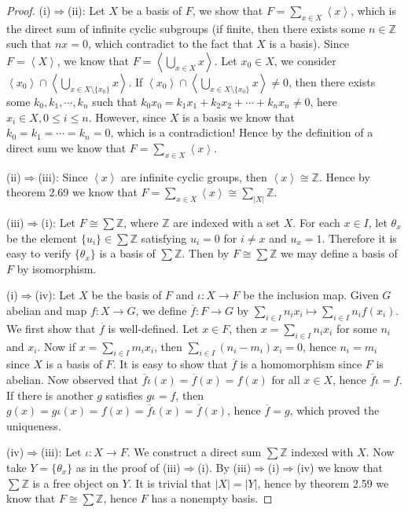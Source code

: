 \begin{proof}
(i)$\Rightarrow$(ii): Let $X$ be a basis of $F$, we show that $F=\sum_{x\in X}\left<x\right>$, which is the direct sum of infinite cyclic subgroups (if finite, then there exists some $n\in\mathbb{Z}$ such that $nx=0$, which contradict to the fact that $X$ is a basis). Since $F=\left<X\right>$, we know that $F=\left<\bigcup_{x\in X}x\right>$. Let $x_0\in X$, we consider $\left<x_0\right>\cap\left<\bigcup_{x\in X\setminus\{x_0\}}x\right>$. If $\left<x_0\right>\cap\left<\bigcup_{x\in X\setminus\{x_0\}}x\right>\ne 0$, then there exists some $k_0,k_1,\cdots,k_n$ such that $k_0x_0=k_1x_1+k_2x_2+\cdots+k_nx_n\ne 0$, here $x_i\in X,0\le i\le n$. However, since $X$ is a basis we know that $k_0=k_1=\cdots=k_n=0$, which is a contradiction! Hence by the definition of a direct sum we know that $F=\sum_{x\in X}\left<x\right>$.\par
(ii)$\Rightarrow$(iii): Since $\left<x\right>$ are infinite cyclic groups, then $\left<x\right>\cong\mathbb{Z}$. Hence by theorem 2.69 we know that $F=\sum_{x\in X}\left<x\right>\cong\sum_{|X|}\mathbb{Z}$.
\par
(iii)$\Rightarrow$(i): Let $F\cong\sum\mathbb{Z}$, where $\mathbb{Z}$ are indexed with a set $X$. For each $x\in I$, let $\theta_x$ be the element $\{u_i\}\in\sum\mathbb{Z}$ satisfying $u_i=0$ for $i\ne x$ and $u_x=1$. Therefore it is easy to verify $\{\theta_x\}$ is a basis of $\sum\mathbb{Z}$. Then by $F\cong\sum\mathbb{Z}$ we may define a basis of $F$ by isomorphism.\par
(i)$\Rightarrow$(iv): Let $X$ be the basis of $F$ and $\iota:X\to F$ be the inclusion map. Given $G$ abelian and map $f:X\to G$, we define $\overline{f}:F\to G$ by $\sum_{i\in I}n_ix_i\mapsto\sum_{i\in I}n_if(x_i)$. We first show that $\overline{f}$ is well-defined. Let $x\in F$, then $x=\sum_{i\in I}n_ix_i$ for some $n_i$ and $x_i$. Now if $x=\sum_{i\in I}m_ix_i$, then $\sum_{i\in I}(n_i-m_i)x_i=0$, hence $n_i=m_i$ since $X$ is a basis of $F$. It is easy to show that $\overline{f}$ is a homomorphism since $F$ is abelian. Now observed that $\overline{f}\iota \left( x \right) =\overline{f}\left( x \right) =f\left( x \right) $ for all $x\in X$, hence $\overline{f}\iota=f$. If there is another $g$ satisfies $g\iota=f$, then $g\left( x \right) =g\iota \left( x \right) =f\left( x \right) =\overline{f}\iota \left( x \right) =\overline{f}\left( x \right) $, hence $\overline{f}=g$, which proved the uniqueness.\par
(iv)$\Rightarrow$(iii): Let $\iota:X\to F$. We construct a direct sum $\sum\mathbb{Z}$ indexed with $X$. Now take $Y=\{\theta_x\}$ as in the proof of (iii)$\Rightarrow$(i). By (iii)$\Rightarrow$(i)$\Rightarrow$(iv) we know that $\sum\mathbb{Z}$ is a free object on $Y$. It is trivial that $|X|=|Y|$, hence by theorem 2.59 we know that $F\cong\sum\mathbb{Z}$, hence $F$ has a nonempty basis.
\end{proof}
